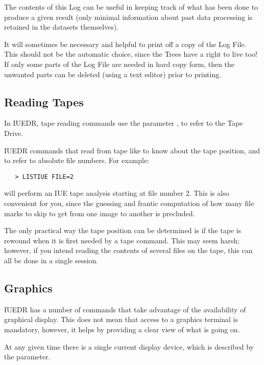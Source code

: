The contents of this Log can be useful in keeping track of what has been
done to produce a given result (only minimal information about past data
processing is retained in the datasets themselves)\@.

It will sometimes be necessary and helpful to print off a copy of the Log
File.  This should not be the automatic choice, since the Trees have a right
to live too!  If only some parts of the Log File are needed in hard copy
form, then the unwanted parts can be deleted (using a text editor) prior to
printing.


\subsection{Reading Tapes}

In IUEDR, tape reading commands use the parameter
, to refer to the
Tape Drive.

IUEDR commands that read from tape like to know about the tape position, and
to refer to absolute file numbers.  For example:

\begin{verbatim}
   > LISTIUE FILE=2
\end{verbatim}

will perform an IUE tape analysis starting at file number 2.  This is also
convenient for you, since the guessing and frantic computation of how many file
marks to skip to get from one image to another is precluded.

The only practical way the tape position can be determined is if the tape is
rewound when it is first needed by a tape command.  This may seem harsh;
however, if you intend reading the contents of several files on the tape,
this can all be done in a single session.


\subsection{\label{subse:graphics}Graphics}

IUEDR has a number of commands that take advantage of the availability of
graphical display.  This does not mean that access to a graphics terminal is
mandatory, however, it helps by providing a clear view of what is going on.

At any given time there is a single current display device, which is
described by the 
 parameter.

